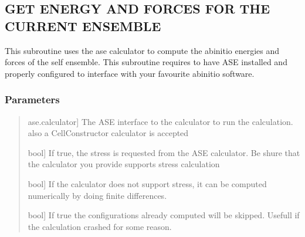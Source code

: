 \documentclass[a4paper,11pt,english]{sphinxmanual}
\begin{document}
\begin{fulllineitems}

\begin{fulllineitems}
\label{\detokenize{apireference:sscha.Ensemble.Ensemble.get_energy_forces}}
\pysigstartsignatures
{}
\pysigstopsignatures

\subsection{GET ENERGY AND FORCES FOR THE CURRENT ENSEMBLE}
\label{\detokenize{apireference:get-energy-and-forces-for-the-current-ensemble}}
\sphinxAtStartPar
This subroutine uses the ase calculator to compute the abinitio energies and forces
of the self ensemble.
This subroutine requires to have ASE installed and properly configured to
interface with your favourite ab\sphinxhyphen{}initio software.


\subsubsection{Parameters}
\label{\detokenize{apireference:id4}}\begin{quote}
\begin{description}
\sphinxlineitem{ase\_calculator}{[}ase.calculator{]}
\sphinxAtStartPar
The ASE interface to the calculator to run the calculation.
also a CellConstructor calculator is accepted

\sphinxlineitem{compute\_stress}{[}bool{]}
\sphinxAtStartPar
If true, the stress is requested from the ASE calculator. Be shure
that the calculator you provide supports stress calculation

\sphinxlineitem{stress\_numerical}{[}bool{]}
\sphinxAtStartPar
If the calculator does not support stress, it can be computed numerically
by doing finite differences.

\sphinxlineitem{skip\_computed}{[}bool{]}
\sphinxAtStartPar
If true the configurations already computed will be skipped.
Usefull if the calculation crashed for some reason.


\end{description}
\end{quote}
\end{fulllineitems}
\end{fulllineitems}
\end{document}
